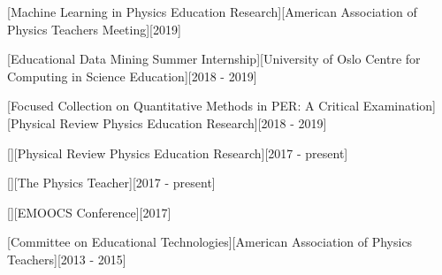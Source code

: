 \documentclass{article}
\begin{document}
[Machine Learning in Physics Education Research][American Association of Physics Teachers Meeting][2019]

[Educational Data Mining Summer Internship][University of Oslo Centre for Computing in Science Education][2018 - 2019]

[Focused Collection on Quantitative Methods in PER: A Critical Examination][Physical Review Physics Education Research][2018 - 2019]

[][Physical Review Physics Education Research][2017 - present]

[][The Physics Teacher][2017 - present]

[][EMOOCS Conference][2017]

[Committee on Educational Technologies][American Association of Physics Teachers][2013 - 2015]

\nocite{*}


\end{document}
